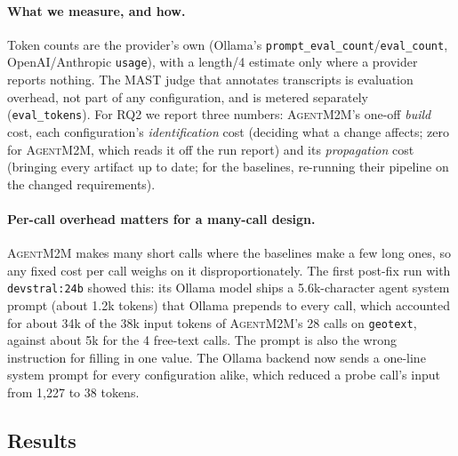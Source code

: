 \documentclass[10pt,a4paper]{article}
\newcommand{\tool}{\textsc{AgentM2M}}
\newcommand{\code}[1]{\texttt{#1}}
\theoremstyle{definition}
\begin{document}
\paragraph{What we measure, and how.} Token counts are the provider's own
(Ollama's \code{prompt\_eval\_count}/\code{eval\_count}, OpenAI/Anthropic
\code{usage}), with a length/4 estimate only where a provider reports
nothing. The MAST judge that annotates transcripts is evaluation overhead,
not part of any configuration, and is metered separately
(\code{eval\_tokens}). For RQ2 we report three numbers: \tool{}'s one-off
\emph{build} cost, each configuration's \emph{identification} cost (deciding
what a change affects; zero for \tool{}, which reads it off the run report)
and its \emph{propagation} cost (bringing every artifact up to date; for the
baselines, re-running their pipeline on the changed requirements).

\paragraph{Per-call overhead matters for a many-call design.} \tool{} makes
many short calls where the baselines make a few long ones, so any fixed cost
per call weighs on it disproportionately. The first post-fix run with
\texttt{devstral:24b} showed this: its Ollama model ships a 5.6k-character
agent system prompt (about 1.2k tokens) that Ollama prepends to every call,
which accounted for about 34k of the 38k input tokens of \tool{}'s 28 calls on
\texttt{geotext}, against about 5k for the 4 free-text calls. The prompt is
also the wrong instruction for filling in one value. The Ollama backend now
sends a one-line system prompt for every configuration alike, which reduced
a probe call's input from 1{,}227 to 38 tokens.

\subsection{Results}
\end{document}
